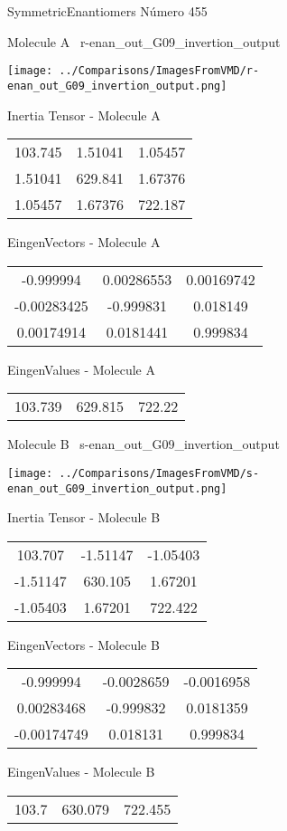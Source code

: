 \vtab[-3cm]
\begin{center}
{\large SymmetricEnantiomers \tab Número 455}
\end{center}
\begin{multicols}{2}
\begin{center}

Molecule A \
r-enan\_out\_G09\_invertion\_output

\texttt{[image: ../Comparisons/ImagesFromVMD/r-enan\_out\_G09\_invertion\_output.png]}

Inertia Tensor - Molecule A \\
\begin{tabular}{|c c c|}
103.745	 & 	1.51041	 & 	1.05457	 \\
1.51041	 & 	629.841	 & 	1.67376	 \\
1.05457	 & 	1.67376	 & 	722.187
\end{tabular}

\vtab
 EingenVectors - Molecule A     \\
\begin{tabular}{|c c c|}
-0.999994	 & 	0.00286553	 & 	0.00169742	 \\
-0.00283425	 & 	-0.999831	 & 	0.018149	 \\
0.00174914	 & 	0.0181441	 & 	0.999834
\end{tabular}

\vtab
 EingenValues - Molecule A     \\
\begin{tabular}{|c c c|}
103.739	 & 	629.815	 & 	722.22	 \\
\end{tabular}
\columnbreak

Molecule B \
s-enan\_out\_G09\_invertion\_output

\texttt{[image: ../Comparisons/ImagesFromVMD/s-enan\_out\_G09\_invertion\_output.png]}

Inertia Tensor - Molecule B \\
\begin{tabular}{|c c c|}
103.707	 & 	-1.51147	 & 	-1.05403	 \\
-1.51147	 & 	630.105	 & 	1.67201	 \\
-1.05403	 & 	1.67201	 & 	722.422
\end{tabular}

\vtab
 EingenVectors - Molecule B     \\
\begin{tabular}{|c c c|}
-0.999994	 & 	-0.0028659	 & 	-0.0016958	 \\
0.00283468	 & 	-0.999832	 & 	0.0181359	 \\
-0.00174749	 & 	0.018131	 & 	0.999834
\end{tabular}

\vtab
 EingenValues - Molecule B     \\
\begin{tabular}{|c c c|}
103.7	 & 	630.079	 & 	722.455	 \\
\end{tabular}

\end{center}
\end{multicols}

